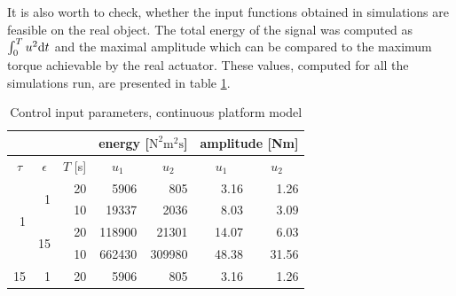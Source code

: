 It is also worth to check, whether the input functions obtained in simulations
are feasible on the real object. The total energy of the signal was computed as $\int_0^T u^2\mathrm{d} t$
and the maximal amplitude which can be compared to the maximum torque achievable by the real actuator.
These values, computed for all the simulations run, are presented in table \ref{tab:control}.
\begin{table}[h]
\centering
\caption{Control input parameters, continuous platform model}
\label{tab:control}
\begin{tabular}{rrr|r|r|r|r|}
\cline{4-7}
\multicolumn{1}{c}{}                      & \multicolumn{1}{c}{}                     & \multicolumn{1}{c|}{}            & \multicolumn{2}{c|}{energy [$\mathrm{N^2m^2s}$]}                             & \multicolumn{2}{c|}{amplitude [Nm]}                          \\ \hline
\multicolumn{1}{|c|}{$\tau$}              & \multicolumn{1}{c|}{$\epsilon$}          & \multicolumn{1}{c|}{$T$ {[}s{]}} & \multicolumn{1}{c|}{$u_1$} & \multicolumn{1}{c|}{$u_2$} & \multicolumn{1}{c|}{$u_1$} & \multicolumn{1}{c|}{$u_2$} \\ \hline
\multicolumn{1}{|r|}{\multirow{4}{*}{1}}  & \multicolumn{1}{r|}{\multirow{2}{*}{1}}  & 20                               & 5906                       & 805                        & 3.16                       & 1.26                       \\ \cline{3-7} 
\multicolumn{1}{|r|}{}                    & \multicolumn{1}{r|}{}                    & 10                               & 19337                      & 2036                       & 8.03                       & 3.09                       \\ \cline{2-7} 
\multicolumn{1}{|r|}{}                    & \multicolumn{1}{r|}{\multirow{2}{*}{15}} & 20                               & 118900                     & 21301                      & 14.07                      & 6.03                       \\ \cline{3-7} 
\multicolumn{1}{|r|}{}                    & \multicolumn{1}{r|}{}                    & 10                               & 662430                     & 309980                     & 48.38                      & 31.56                      \\ \hline
\multicolumn{1}{|r|}{\multirow{4}{*}{15}} & \multicolumn{1}{r|}{\multirow{2}{*}{1}}  & 20                               & 5906                       & 805                        & 3.16                       & 1.26                       \\ \cline{3-7} 

\end{tabular}
\end{table}
